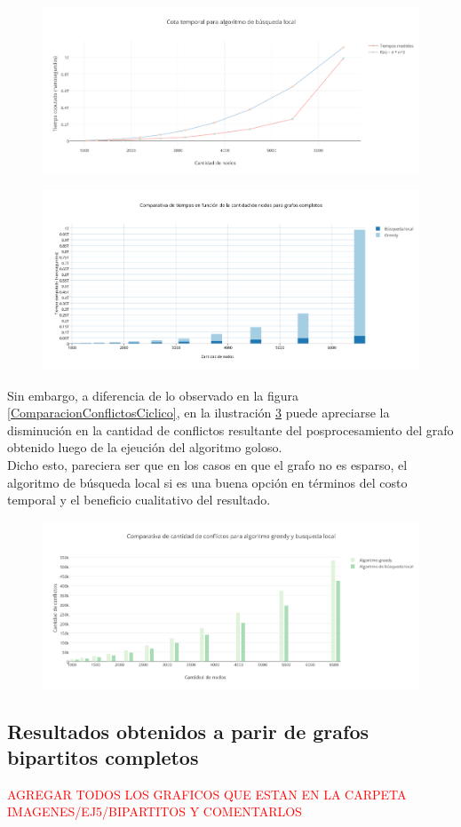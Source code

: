  \begin{figure}[H]
    \centering
  	\includegraphics[width=18cm]{imagenes/Ej5/TiemposLocalCompleto.png}
    \caption{}
 	  \label{TiemposLocalCompleto}
  \end{figure}

 \begin{figure}[H]
    \centering
  	\includegraphics[width=18cm]{imagenes/Ej5/ComparacionTiemposCompleto.png}
    \caption{}
 	  \label{ComparacionTiemposCompleto}
  \end{figure}

Sin embargo, a diferencia de lo observado en la figura \ref{ComparacionConflictosCiclico}, en la ilustración \ref{ComparacionConflictosCompleto} puede apreciarse la disminución en la cantidad de conflictos resultante del posprocesamiento del grafo obtenido luego de la ejeución del algoritmo goloso.\\
Dicho esto, pareciera ser que en los casos en que el grafo no es esparso, el algoritmo de búsqueda local si es una buena opción en términos del costo temporal y el beneficio cualitativo del resultado.

 \begin{figure}[H]
    \centering
  	\includegraphics[width=18cm]{imagenes/Ej5/ComparacionConflictosCompleto.png}
    \caption{}
 	  \label{ComparacionConflictosCompleto}
  \end{figure}

\subsection {Resultados obtenidos a parir de grafos bipartitos completos}

\textcolor{red}{\huge{AGREGAR TODOS LOS GRAFICOS QUE ESTAN EN LA CARPETA IMAGENES/EJ5/BIPARTITOS Y COMENTARLOS}}
